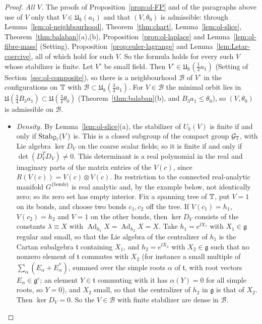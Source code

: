 \begin{proof}
\emph{All $V$.} The proofs of Proposition~\ref{prop:ol-FP} and of the paragraphs above use of $V$ only that $V\in\mathfrak U_k(a_1)$ and that $(V,\theta_0)$ is admissible: through Lemma~\ref{lem:ol-neighbourhood}, Theorem~\ref{thm:chart}, Lemma~\ref{lem:ol-slice}, Theorem~\ref{thm:balaban}(a),(b), Proposition~\ref{prop:ol-laplace} and Lemma~\ref{lem:ol-fibre-mass} (Setting), Proposition~\ref{prop:euler-lagrange} and Lemma~\ref{lem:Lstar-coercive}, all of which hold for such $V$. So the formula holds for every such $V$ whose stabilizer is finite. Let $V^\circ$ be small field. Then $V^\circ\in\mathfrak U_k(\frac12a_1)$ (Setting of Section~\ref{sec:ol-composite}), so there is a neighbourhood $\mathcal B$ of $V^\circ$ in the configurations on $\mathbb T$ with $\mathcal B\subset\mathfrak U_k(\frac34a_1)$. For $V\in\mathcal B$ the minimal orbit lies in $\mathfrak U(\frac34B_3a_1)\subset\mathfrak U(\frac34\theta_0)$ (Theorem~\ref{thm:balaban}(b), and $B_3a_1\le\theta_0$), so $(V,\theta_0)$ is admissible on $\mathcal B$.
\begin{itemize}
\item \emph{Density.} By Lemma~\ref{lem:ol-slice}(a), the stabilizer of $U_k(V)$ is finite if and only if $\operatorname{Stab}_{\mathcal G_\mathbb T}(V)$ is. This is a closed subgroup of the compact group $\mathcal G_\mathbb T$, with Lie algebra $\ker D_V$ on the coarse scalar fields; so it is finite if and only if $\det(D_V^TD_V)\ne0$. This determinant is a real polynomial in the real and imaginary parts of the matrix entries of the $V(c)$, since $R(V(c))=V(c)\otimes\overline{V(c)}$. Its restriction to the connected real-analytic manifold $G^{\{\text{bonds}\}}$ is real analytic and, by the example below, not identically zero; so its zero set has empty interior. Fix a spanning tree of $\mathbb T$, put $V=1$ on its bonds, and choose two bonds $c_1,c_2$ off the tree. If $V(c_1)=h_1$, $V(c_2)=h_2$ and $V=1$ on the other bonds, then $\ker D_V$ consists of the constants $\lambda\equiv X$ with $\operatorname{Ad}_{h_1}X=\operatorname{Ad}_{h_2}X=X$. Take $h_1=e^{\ii X_1}$ with $X_1\in\mathfrak g$ regular and small, so that the Lie algebra of the centralizer of $h_1$ is the Cartan subalgebra $\mathfrak t$ containing $X_1$, and $h_2=e^{\ii X_2}$ with $X_2\in\mathfrak g$ such that no nonzero element of $\mathfrak t$ commutes with $X_2$ (for instance a small multiple of $\sum_\alpha(E_\alpha+E_\alpha^*)$, summed over the simple roots $\alpha$ of $\mathfrak t$, with root vectors $E_\alpha\in\mathfrak g^c$; an element $Y\in\mathfrak t$ commuting with it has $\alpha(Y)=0$ for all simple roots, so $Y=0$), and $X_2$ small, so that the centralizer of $h_2$ in $\mathfrak g$ is that of $X_2$. Then $\ker D_V=0$. So the $V\in\mathcal B$ with finite stabilizer are dense in $\mathcal B$.

\end{itemize}
\end{proof}

